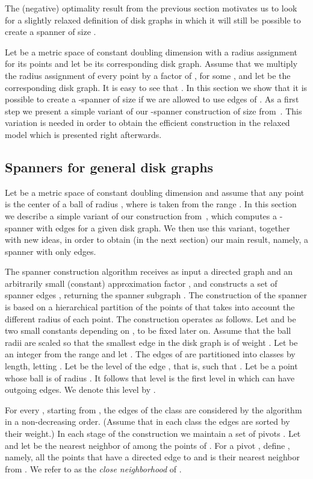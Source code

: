 \documentclass[proceedings]{stacs}
\theoremstyle{plain}\newtheorem{satz}[thm]{Satz}
\theoremstyle{definition}\newtheorem{crucial}[thm]{Crucial Definition}
\begin{document}
The (negative) optimality result from the previous section
motivates us to look for a slightly relaxed definition of disk
graphs in which it will still be possible to create a spanner of
size .

Let  be a metric space of constant doubling dimension
 with a radius assignment  for its points and let
 be its corresponding disk graph. Assume that we
multiply the radius assignment of every point by a factor of
, for some , and let  be the
corresponding disk graph. It is easy to see that .
In this section we show that it is possible to create a
-spanner of size  if we are allowed to use
edges of . As a first step we present a simple variant of our
-spanner construction of size 
from~\cite{PeRo08}. This variation is needed in order to obtain
the efficient construction in the relaxed model which is presented
right afterwards.

\subsection{Spanners for general disk graphs} \label{s:DG}


Let  be a metric space of constant doubling dimension
and assume that any point  is the center of a ball of
radius , where  is taken from the range . In
this section we describe a simple variant of our construction
from~\cite{PeRo08}, which computes a -spanner with
 edges for a given disk graph. We then
use this variant, together with new ideas, in order to obtain (in
the next section) our main result, namely, a spanner with only
 edges.

The spanner construction algorithm receives as input a directed
graph  and an arbitrarily small (constant) approximation
factor , and constructs a set of spanner edges
, returning the spanner subgraph
. The construction of the spanner is
based on a hierarchical partition of the points of  that takes
into account the different radius of each point. The construction
operates as follows. Let  and  be two small
constants depending on , to be fixed later on. Assume
that the ball radii are scaled so that the smallest edge in the
disk graph is of weight . Let  be an integer from the range
 and let . The edges of  are partitioned into
classes by length, letting . Let  be the level of the
edge , that is,  such that . Let  be a point whose ball is of radius
. It follows that level  is the first
level in which  can have outgoing edges. We denote this level
by .

For every , starting
from , the edges of the class  are considered
by the algorithm in a non-decreasing order. (Assume that in each
class the edges are sorted by their weight.) In each stage of the
construction we maintain a set of pivots . Let  and
let  be the nearest neighbor of  among the points
of . For a pivot , define , namely, all the
points that have a directed edge to  and  is their nearest
neighbor from . We refer to  as the {\em close
neighborhood} of .
\end{document}
